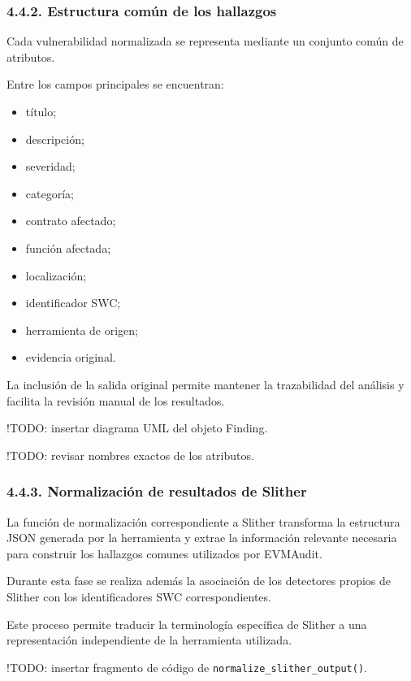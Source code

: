 \subsubsection{4.4.2. Estructura común de los
hallazgos}\label{estructura-comuxfan-de-los-hallazgos}

Cada vulnerabilidad normalizada se representa mediante un conjunto común
de atributos.

Entre los campos principales se encuentran:

\begin{itemize}
\tightlist
\item
  título;
\item
  descripción;
\item
  severidad;
\item
  categoría;
\item
  contrato afectado;
\item
  función afectada;
\item
  localización;
\item
  identificador SWC;
\item
  herramienta de origen;
\item
  evidencia original.
\end{itemize}

La inclusión de la salida original permite mantener la trazabilidad del
análisis y facilita la revisión manual de los resultados.

!TODO: insertar diagrama UML del objeto Finding.

!TODO: revisar nombres exactos de los atributos.

\subsubsection{4.4.3. Normalización de resultados de
Slither}\label{normalizaciuxf3n-de-resultados-de-slither}

La función de normalización correspondiente a Slither transforma la
estructura JSON generada por la herramienta y extrae la información
relevante necesaria para construir los hallazgos comunes utilizados por
EVMAudit.

Durante esta fase se realiza además la asociación de los detectores
propios de Slither con los identificadores SWC correspondientes.

Este proceso permite traducir la terminología específica de Slither a
una representación independiente de la herramienta utilizada.

!TODO: insertar fragmento de código de
\texttt{normalize\_slither\_output()}.

